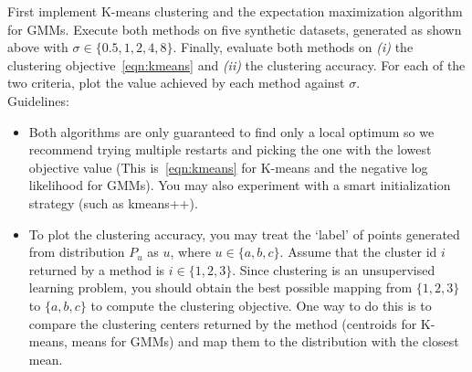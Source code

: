 \documentclass[a4paper]{article}
\newcounter{thm}
\theoremstyle{definition}
\begin{document}
First implement K-means clustering and the expectation maximization algorithm for GMMs.
Execute both methods on five synthetic datasets,
generated as shown above with $\sigma \in \{0.5, 1, 2, 4, 8\}$. Finally, evaluate both methods on \emph{(i)} the clustering objective~\eqref{eqn:kmeans} and \emph{(ii)}  the clustering accuracy. For each of the two criteria, plot the value achieved by each method against $\sigma$.\\


Guidelines:
\begin{itemize} 
\item Both algorithms are only guaranteed to find only a local optimum so we recommend trying multiple
restarts and picking the one with the lowest objective value (This is~\eqref{eqn:kmeans} for K-means and the negative log likelihood for GMMs).
You may also experiment with a smart initialization
strategy (such as kmeans++).

\item
To plot the clustering accuracy,  you may treat the `label' of points generated from distribution
$P_u$ as $u$, where $u\in \{a, b, c\}$.
Assume that the cluster id $i$ returned by a method is $i\in \{1, 2, 3\}$.
Since clustering is an unsupervised learning problem, you should obtain the best possible mapping
from $\{1, 2, 3\}$ to $\{a, b, c\}$ to compute the clustering objective.
One way to do this is to compare the clustering centers returned by the method (centroids for
K-means, means for GMMs) and map them to the distribution with the closest mean.

\end{itemize}
\end{document}
